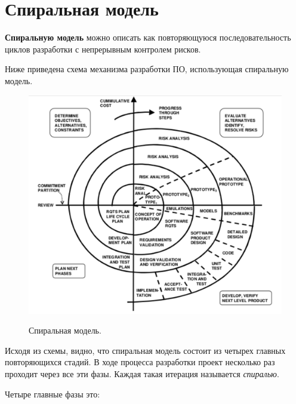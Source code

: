 \documentclass[a4paper,14pt]{extarticle}
\begin{document}
 	\section{Спиральная модель}
 	
 	{\bf Спиральную модель}  можно описать как повторяющуюся последовательность циклов разработки с непрерывным контролем рисков.
 	
 	Ниже приведена схема механизма разработки ПО, использующая спиральную модель.
 	
 	\begin{figure}[h!]
 		\begin{center}
 			{\includegraphics[scale = 0.4]{spiral.png}}
 			\label{ris:spiral}
 		\end{center}
 		\caption{Спиральная модель.}
 	\end{figure}
 
 	Исходя из схемы, видно, что спиральная модель состоит из четырех главных повторяющихся стадий. В ходе процесса разработки проект несколько раз проходит через все эти фазы. Каждая такая итерация называется \textit{спиралью}.
 	
 	Четыре главные фазы это:
 	
\end{document}
